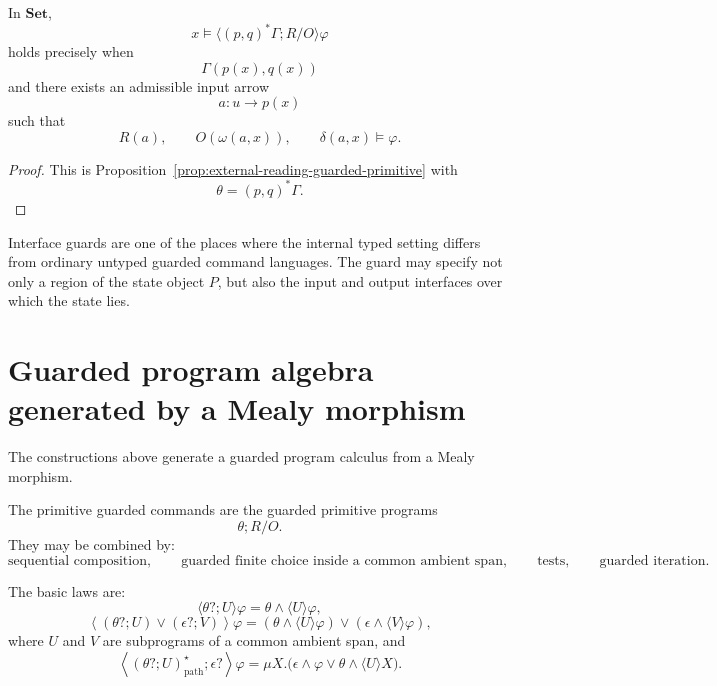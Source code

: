 \begin{proposition}
\label{prop:interface-guarded-external-reading}
In \(\mathbf{Set}\),
\[
x\models \langle (p,q)^\ast\Gamma;R/O\rangle\varphi
\]
holds precisely when
\[
\Gamma(p(x),q(x))
\]
and there exists an admissible input arrow
\[
a:u\to p(x)
\]
such that
\[
R(a),
\qquad
O(\omega(a,x)),
\qquad
\delta(a,x)\models\varphi.
\]
\end{proposition}

\begin{proof}
This is Proposition~\ref{prop:external-reading-guarded-primitive} with
\[
\theta=(p,q)^\ast\Gamma.
\]
\end{proof}

\begin{remark}
\label{rem:typed-guarded-control}
Interface guards are one of the places where the internal typed setting
differs from ordinary untyped guarded command languages. The guard may
specify not only a region of the state object \(P\), but also the input
and output interfaces over which the state lies.
\end{remark}

\section{Guarded program algebra generated by a Mealy morphism}
\label{sec:guarded-program-algebra-generated-mealy}

The constructions above generate a guarded program calculus from a Mealy
morphism.

The primitive guarded commands are the guarded primitive programs
\[
\theta;R/O.
\]
They may be combined by:
\[
\text{sequential composition},
\qquad
\text{guarded finite choice inside a common ambient span},
\qquad
\text{tests},
\qquad
\text{guarded iteration}.
\]

The basic laws are:
\[
\langle \theta?;U\rangle\varphi
=
\theta\wedge\langle U\rangle\varphi,
\]
\[
\left\langle
(\theta?;U)\vee(\epsilon?;V)
\right\rangle\varphi
=
(\theta\wedge\langle U\rangle\varphi)
\vee
(\epsilon\wedge\langle V\rangle\varphi),
\]
where \(U\) and \(V\) are subprograms of a common ambient span, and
\[
\left\langle
(\theta?;U)^\star_{\mathrm{path}};\epsilon?
\right\rangle\varphi
=
\mu X.\bigl(
\epsilon\wedge\varphi
\vee
\theta\wedge\langle U\rangle X
\bigr).
\]

